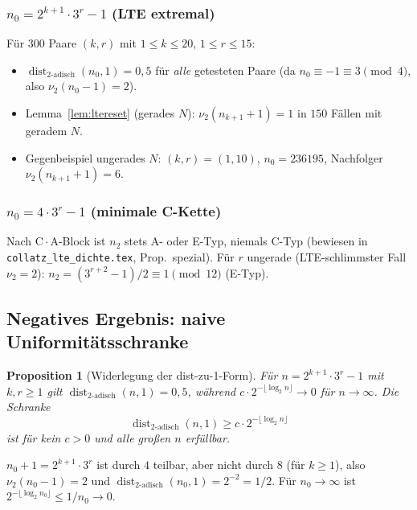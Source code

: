 \documentclass[12pt,a4paper]{article}
\newtheorem{proposition}[satz]{Proposition}
\newcommand{\vii}{\nu_2}
\newcommand{\disttwo}{\operatorname{dist}_{2\text{-adisch}}}
\begin{document}
\subsubsection{$n_0=2^{k+1}\cdot 3^r-1$ (LTE extremal)}

Für $300$ Paare $(k,r)$ mit $1\leq k\leq 20$, $1\leq r\leq 15$:

\begin{itemize}[nosep]
  \item $\disttwo(n_0,1)=0{,}5$ für \emph{alle} getesteten Paare
    (da $n_0\equiv -1\equiv 3\pmod 4$, also $\vii(n_0-1)=2$).
  \item Lemma~\ref{lem:ltereset} (gerades $N$): $\vii(n_{k+1}+1)=1$ in
    $150$ Fällen mit geradem $N$.
  \item Gegenbeispiel ungerades $N$: $(k,r)=(1,10)$, $n_0=236195$,
    Nachfolger $\vii(n_{k+1}+1)=6$.
\end{itemize}

\subsubsection{$n_0=4\cdot 3^r-1$ (minimale C-Kette)}

Nach $\mathrm{C}\cdot\mathrm{A}$-Block ist $n_2$ stets A- oder E-Typ,
niemals C-Typ (bewiesen in \texttt{collatz\_lte\_dichte.tex},
Prop.~spezial). Für $r$ ungerade (LTE-schlimmster Fall $\vii=2$):
$n_2=(3^{r+2}-1)/2\equiv 1\pmod{12}$ (E-Typ).

\subsection{Negatives Ergebnis: naive Uniformitätsschranke}

\begin{proposition}[Widerlegung der dist-zu-1-Form]
\label{prop:counter}
Für $n=2^{k+1}\cdot 3^r-1$ mit $k,r\geq 1$ gilt
$\disttwo(n,1)=0{,}5$, während $c\cdot 2^{-\lfloor\log_2 n\rfloor}\to 0$
für $n\to\infty$. Die Schranke
\[
  \disttwo(n,1)\geq c\cdot 2^{-\lfloor\log_2 n\rfloor}
\]
ist für kein $c>0$ und alle großen $n$ erfüllbar.
\end{proposition}

\begin{beweis}
$n_0+1=2^{k+1}\cdot 3^r$ ist durch $4$ teilbar, aber nicht durch $8$
(für $k\geq 1$), also $\vii(n_0-1)=2$ und $\disttwo(n_0,1)=2^{-2}=1/2$.
Für $n_0\to\infty$ ist $2^{-\lfloor\log_2 n_0\rfloor}\leq 1/n_0\to 0$.
\end{beweis}
\end{document}
